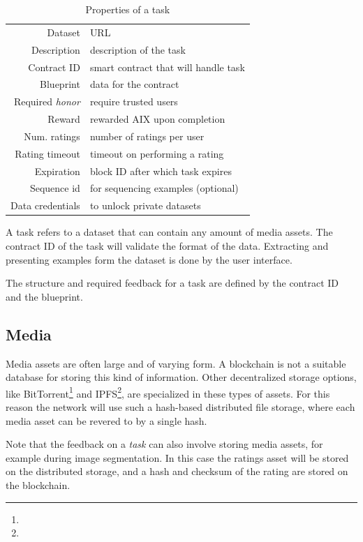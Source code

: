 \documentclass{article}
\begin{document}
\begin{table}[h]
  \centering
  \begin{tabular}[h]{r|l}
    Dataset & URL \\
    Description & description of the task \\ 
    Contract ID & smart contract that will handle task \\
    Blueprint & data for the contract \\ 
    Required \emph{honor} & require trusted users \\
    Reward & rewarded AIX upon completion \\
    Num. ratings & number of ratings per user \\
    Rating timeout & timeout on performing a rating \\ 
    Expiration  & block ID after which task expires \\
    Sequence id & for sequencing examples (optional)\\
    Data credentials & to unlock private datasets \\
  \end{tabular}
  \caption{Properties of a task}
  \label{tab:task}
\end{table}

A task refers to a dataset that can contain any amount of media
assets. The contract ID of the task will validate the format of the
data. Extracting and presenting examples form the dataset is done by
the user interface.

The structure and required feedback for a task are defined by the
contract ID and the blueprint.

\subsection{Media}
Media assets are often large and of varying form. A blockchain is not
a suitable database for storing this kind of information. Other
decentralized storage options, like BitTorrent\footnote{} and
IPFS\footnote{}, are specialized in these types of assets. For this
reason the network will use such a hash-based distributed file
storage, where each media asset can be revered to by a single hash.

Note that the feedback on a \emph{task} can also involve storing media
assets, for example during image segmentation. In this case the
ratings asset will be stored on the distributed storage, and a hash
and checksum of the rating are stored on the blockchain.
\end{document}
